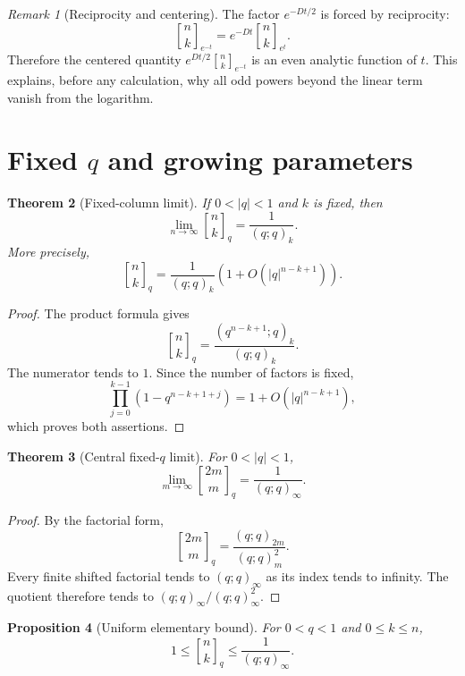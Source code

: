 \documentclass[11pt,oneside,openany]{book}
\newtheorem{theorem}{Theorem}[chapter]
\newtheorem{proposition}[theorem]{Proposition}
\theoremstyle{definition}
\theoremstyle{remark}
\newtheorem{remark}[theorem]{Remark}
\newcommand{\qbinom}[2]{\genfrac{[}{]}{0pt}{}{#1}{#2}_{q}}
\newcommand{\Qbinom}[3]{\genfrac{[}{]}{0pt}{}{#1}{#2}_{#3}}
\newcommand{\abs}[1]{\lvert #1\rvert}
\begin{document}
\begin{remark}[Reciprocity and centering]
The factor $e^{-Dt/2}$ is forced by reciprocity:
\[
 \Qbinom nk{e^{-t}}
 =e^{-Dt}\Qbinom nk{e^t}.
\]
Therefore the centered quantity $e^{Dt/2}\Qbinom nk{e^{-t}}$ is an even analytic function of $t$.  This explains, before any calculation, why all odd powers beyond the linear term vanish from the logarithm.
\end{remark}

\section{Fixed \texorpdfstring{$q$}{q} and growing parameters}

\begin{theorem}[Fixed-column limit]\label{thm:fixed-column-limit}
If $0<\abs q<1$ and $k$ is fixed, then
\[
 \lim_{n\to\infty}\qbinom nk=\frac1{(q;q)_k}.
 \tag{19.5}\label{eq:fixed-column-limit}
\]
More precisely,
\[
 \qbinom nk
 =\frac1{(q;q)_k}\left(1+O(\abs q^{n-k+1})\right).
 \tag{19.6}\label{eq:fixed-column-error}
\]
\end{theorem}

\begin{proof}
The product formula gives
\[
 \qbinom nk=\frac{(q^{n-k+1};q)_k}{(q;q)_k}.
\]
The numerator tends to $1$.  Since the number of factors is fixed,
\[
 \prod_{j=0}^{k-1}(1-q^{n-k+1+j})
 =1+O(\abs q^{n-k+1}),
\]
which proves both assertions.
\end{proof}

\begin{theorem}[Central fixed-$q$ limit]\label{thm:central-fixed-q}
For $0<\abs q<1$,
\[
 \lim_{m\to\infty}\qbinom{2m}{m}
 =\frac1{(q;q)_\infty}.
 \tag{19.7}\label{eq:central-fixed-q}
\]
\end{theorem}

\begin{proof}
By the factorial form,
\[
 \qbinom{2m}{m}
 =\frac{(q;q)_{2m}}{(q;q)_m^2}.
\]
Every finite shifted factorial tends to $(q;q)_\infty$ as its index tends to infinity.  The quotient therefore tends to
$(q;q)_\infty/(q;q)_\infty^2$.
\end{proof}

\begin{proposition}[Uniform elementary bound]\label{prop:gaussian-bound}
For $0<q<1$ and $0\le k\le n$,
\[
 1\le\qbinom nk\le\frac1{(q;q)_\infty}.
 \tag{19.8}\label{eq:gaussian-bound}
\]
\end{proposition}
\end{document}
